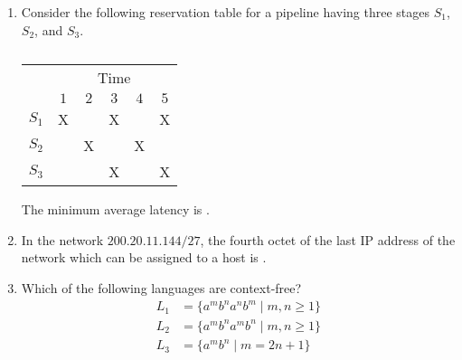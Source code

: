 \documentclass[journal,12pt,onecolumn]{IEEEtran}
\theoremstyle{remark}
\begin{document}
\begin{enumerate}
		\hfill{}
		
		\begin{enumerate}
		\end{enumerate}
		
		\item Consider the following reservation table for a pipeline having three stages $S_1$, $S_2$, and $S_3$.
		
		\begin{table}[h]
			\centering
			\caption*{}
			\label{tab:reservation}
			\begin{tabular}{|c|c|c|c|c|c|}
				\hline
				& \multicolumn{5}{c|}{Time} \\
				\cline{2-6}
				& $1$ & $2$ & $3$ & $4$ & $5$ \\
				\hline
				$S_1$ & X & & X & & X \\
				\hline
				$S_2$ & & X & & X & \\
				\hline
				$S_3$ & & & X & & X \\
				\hline
			\end{tabular}
		\end{table}
		
		The minimum average latency  is \underline{\hspace{2cm}}.
		
		\hfill{}
		
		\item In the network $200.20.11.144/27$, the fourth octet  of the last IP address of the network which can be assigned to a host is \underline{\hspace{2cm}}.
		
		\hfill{}
		
		\item Which of the following languages are context-free?
		\begin{align*}
			L_1 &= \{a^m b^n a^n b^m \mid m, n \geq 1\}\\
			L_2 &= \{a^m b^n a^m b^n \mid m, n \geq 1\}\\
			L_3 &= \{a^m b^n \mid m = 2n + 1\}
		\end{align*}
		

\end{enumerate}
\end{document}
